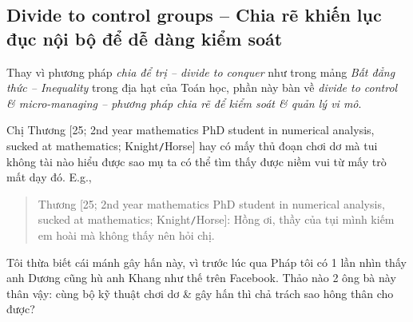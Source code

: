 \documentclass[12pt,oneside]{book}
\begin{document}
\subsection{Divide to control groups -- Chia rẽ khiến lục đục nội bộ để dễ dàng kiểm soát}
Thay vì phương pháp {\it chia để trị -- divide to conquer} như trong mảng {\it Bất đẳng thức -- Inequality} trong địa hạt của Toán học, phần này bàn về {\it divide to control \& micro-managing -- phương pháp chia rẽ để kiểm soát \& quản lý vi mô}.

Chị {\sf Thương [25; 2nd year mathematics PhD student in numerical analysis, sucked at mathematics; Knight{\tt/}Horse]} hay có mấy thủ đoạn chơi dơ mà tui không tài nào hiểu được sao mụ ta có thể tìm thấy được niềm vui từ mấy trò mất dạy đó. E.g.,
\begin{quote}
	{\sf Thương [25; 2nd year mathematics PhD student in numerical analysis, sucked at mathematics; Knight{\tt/}Horse]}: Hồng ơi, thầy của tụi mình kiếm em hoài mà không thấy nên hỏi chị.
\end{quote}
Tôi thừa biết cái mánh gây hấn này, vì trước lúc qua Pháp tôi có 1 lần nhìn thấy anh {\sf Dương} cũng hù anh {\sf Khang} như thế trên Facebook. Thảo nào 2 ông bà này thân vậy: cùng bộ kỹ thuật chơi dơ \& gây hấn thì chả trách sao hông thân cho được?
\end{document}
